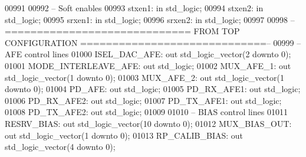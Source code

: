 \begin{DoxyCode}
00991         
00992 \textcolor{keyword}{        -- Soft enables}
00993         stxen1: \textcolor{keywordflow}{in} \textcolor{comment}{std\_logic};
00994         stxen2: \textcolor{keywordflow}{in} \textcolor{comment}{std\_logic};
00995         srxen1: \textcolor{keywordflow}{in} \textcolor{comment}{std\_logic};
00996         srxen2: \textcolor{keywordflow}{in} \textcolor{comment}{std\_logic};
00997         
00998 \textcolor{keyword}{        --============================= FROM TOP CONFIGURATION =============================--}
00999 \textcolor{keyword}{        -- AFE control lines}
01000         ISEL\_DAC\_AFE:   \textcolor{keywordflow}{out} \textcolor{comment}{std\_logic\_vector}(\textcolor{vhdllogic}{}\textcolor{vhdllogic}{2} \textcolor{keywordflow}{downto} \textcolor{vhdllogic}{}\textcolor{vhdllogic}{0});
01001         MODE\_INTERLEAVE\_AFE:    \textcolor{keywordflow}{out} \textcolor{comment}{std\_logic};
01002         MUX\_AFE\_1:      \textcolor{keywordflow}{out} \textcolor{comment}{std\_logic\_vector}(\textcolor{vhdllogic}{}\textcolor{vhdllogic}{1} \textcolor{keywordflow}{downto} \textcolor{vhdllogic}{}\textcolor{vhdllogic}{0});
01003         MUX\_AFE\_2:      \textcolor{keywordflow}{out} \textcolor{comment}{std\_logic\_vector}(\textcolor{vhdllogic}{}\textcolor{vhdllogic}{1} \textcolor{keywordflow}{downto} \textcolor{vhdllogic}{}\textcolor{vhdllogic}{0});
01004         PD\_AFE:         \textcolor{keywordflow}{out} \textcolor{comment}{std\_logic};
01005         PD\_RX\_AFE1:     \textcolor{keywordflow}{out} \textcolor{comment}{std\_logic};
01006         PD\_RX\_AFE2:     \textcolor{keywordflow}{out} \textcolor{comment}{std\_logic};
01007         PD\_TX\_AFE1:     \textcolor{keywordflow}{out} \textcolor{comment}{std\_logic};
01008         PD\_TX\_AFE2:     \textcolor{keywordflow}{out} \textcolor{comment}{std\_logic};
01009         
01010 \textcolor{keyword}{        -- BIAS control lines}
01011         RESRV\_BIAS: \textcolor{keywordflow}{out} \textcolor{comment}{std\_logic\_vector}(\textcolor{vhdllogic}{}\textcolor{vhdllogic}{10} \textcolor{keywordflow}{downto} \textcolor{vhdllogic}{}\textcolor{vhdllogic}{0});
01012         MUX\_BIAS\_OUT:   \textcolor{keywordflow}{out} \textcolor{comment}{std\_logic\_vector}(\textcolor{vhdllogic}{}\textcolor{vhdllogic}{1} \textcolor{keywordflow}{downto} \textcolor{vhdllogic}{}\textcolor{vhdllogic}{0});
01013         RP\_CALIB\_BIAS:  \textcolor{keywordflow}{out} \textcolor{comment}{std\_logic\_vector}(\textcolor{vhdllogic}{}\textcolor{vhdllogic}{4} \textcolor{keywordflow}{downto} \textcolor{vhdllogic}{}\textcolor{vhdllogic}{0});

\end{DoxyCode}
